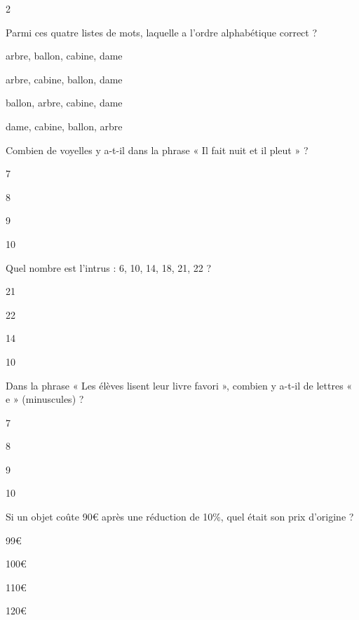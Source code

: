 \begin{multicols}{2}
\begin{question}{}{}
Parmi ces quatre listes de mots, laquelle a l’ordre alphabétique correct ?
\begin{enumeratebf}
\item arbre, ballon, cabine, dame
\item arbre, cabine, ballon, dame
\item ballon, arbre, cabine, dame
\item dame, cabine, ballon, arbre
\end{enumeratebf}
\end{question}

\begin{question}{}{}
Combien de voyelles y a-t-il dans la phrase « Il fait nuit et il pleut » ?
\begin{enumeratebf}
\item 7
\item 8
\item 9
\item 10
\end{enumeratebf}
\end{question}

\begin{question}{}{}
Quel nombre est l’intrus : 6, 10, 14, 18, 21, 22 ?
\begin{enumeratebf}
\item 21
\item 22
\item 14
\item 10
\end{enumeratebf}
\end{question}

\begin{question}{}{}
Dans la phrase « Les élèves lisent leur livre favori », combien y a-t-il de lettres « e » (minuscules) ?
\begin{enumeratebf}
\item 7
\item 8
\item 9
\item 10
\end{enumeratebf}
\end{question}

\begin{question}{}{}
Si un objet coûte 90€ après une réduction de 10\%, quel était son prix d’origine ?
\begin{enumeratebf}
\item 99€
\item 100€
\item 110€
\item 120€
\end{enumeratebf}
\end{question}



\end{multicols}
